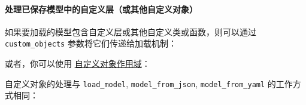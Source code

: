 \paragraph{处理已保存模型中的自定义层（或其他自定义对象）}\label{ux5904ux7406ux5df2ux4fddux5b58ux6a21ux578bux4e2dux7684ux81eaux5b9aux4e49ux5c42ux6216ux5176ux4ed6ux81eaux5b9aux4e49ux5bf9ux8c61}

如果要加载的模型包含自定义层或其他自定义类或函数，则可以通过
\texttt{custom\_objects} 参数将它们传递给加载机制：

\begin{Shaded}
\begin{Highlighting}[]
  
\OperatorTok{=} \OperatorTok{=}\NormalTok{\{}
\end{Highlighting}
\end{Shaded}

或者，你可以使用
\hyperref[customobjectscope]{自定义对象作用域}：

\begin{Shaded}
\begin{Highlighting}[]
  

 
    \OperatorTok{=} \NormalTok{)}
\end{Highlighting}
\end{Shaded}

自定义对象的处理与 \texttt{load\_model}, \texttt{model\_from\_json},
\texttt{model\_from\_yaml} 的工作方式相同：

\begin{Shaded}
\begin{Highlighting}[]
  
\OperatorTok{=} \OperatorTok{=}\NormalTok{\{}
\end{Highlighting}
\end{Shaded}



